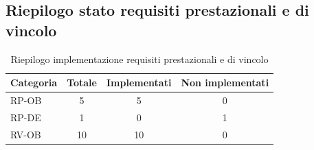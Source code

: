 \documentclass[a4paper, 11pt, oneside]{scrartcl}
\begin{document}
\subsection{Riepilogo stato requisiti prestazionali e di vincolo}

\begin{table}[H]
    \centering
    \renewcommand{\arraystretch}{1.2}
    \begin{tabular}{@{}lccc@{}}
        \toprule
        \textbf{Categoria} & \textbf{Totale} & \textbf{Implementati} & \textbf{Non implementati} \\
        \midrule
        RP-OB & 5  & 5  & 0 \\
        RP-DE & 1  & 0  & 1 \\
        RV-OB & 10 & 10 & 0 \\
        \bottomrule
    \end{tabular}
    \caption{Riepilogo implementazione requisiti prestazionali e di vincolo}
    \label{tab:riepilogo_requisiti_non_funzionali}
\end{table}
\end{document}
